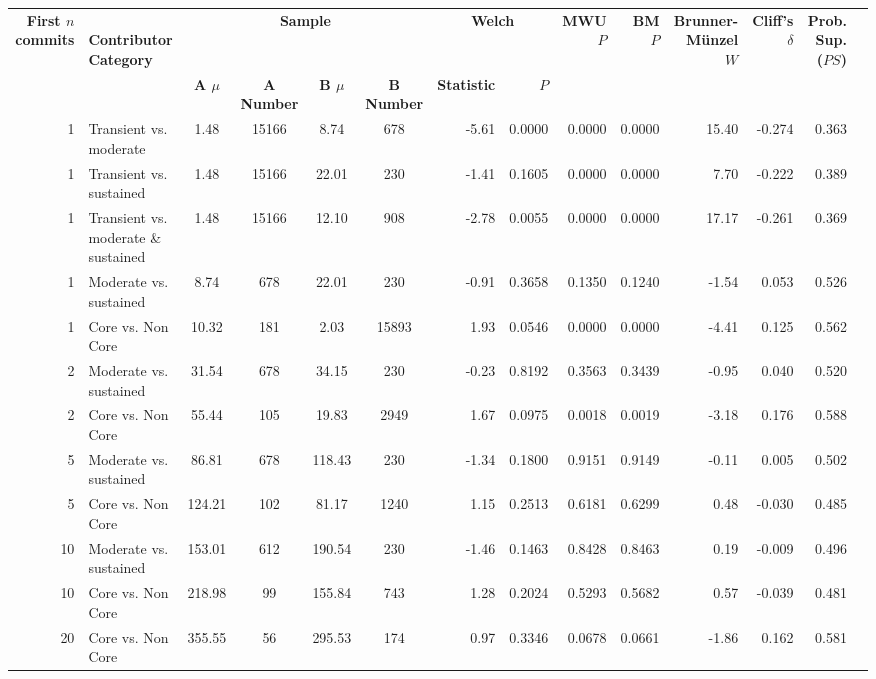 \begin{landscape}
\begin{table}[H]
\begin{tabular}{r p{4cm} c c c c r r r r r r r r}
\toprule
\makecell[t]{\textbf{First $n$}\\\textbf{commits}} & \makecell[t]{\textbf{}\\\textbf{Contributor}\\\textbf{Category}} & \multicolumn{4}{c}{\textbf{Sample}} & \multicolumn{2}{c}{\textbf{Welch}} & \textbf{MWU $P$} & \textbf{BM $P$} & \makecell[t]{\textbf{}\\\textbf{Brunner-Münzel}\\\textbf{$W$}} & \makecell[t]{\textbf{Cliff's}\\\textbf{$\delta$}} & \makecell[t]{\textbf{Prob. Sup.}\\\textbf{($PS$)}} \\ 
\cmidrule(lr){3-6} \cmidrule(lr){7-8}
 &  & \textbf{A $\mu$} & \textbf{A Number} & \textbf{B $\mu$} & \textbf{B Number} & \textbf{Statistic} & \textbf{$P$} &  &  &  &  &  \\ 
\midrule
1 & Transient vs. moderate &  1.48 & 15166 & 8.74 & 678 & -5.61 & 0.0000 & 0.0000 & 0.0000 & 15.40 & -0.274 & 0.363 \\ 
1 & Transient vs. sustained &  1.48 & 15166 & 22.01 & 230 & -1.41 & 0.1605 & 0.0000 & 0.0000 & 7.70 & -0.222 & 0.389 \\ 
1 & Transient vs. moderate \& sustained &  1.48 & 15166 & 12.10 & 908 & -2.78 & 0.0055 & 0.0000 & 0.0000 & 17.17 & -0.261 & 0.369 \\ 
1 & Moderate vs. sustained &  8.74 & 678 & 22.01 & 230 & -0.91 & 0.3658 & 0.1350 & 0.1240 & -1.54 & 0.053 & 0.526 \\ 
1 & Core vs. Non Core &  10.32 & 181 & 2.03 & 15893 & 1.93 & 0.0546 & 0.0000 & 0.0000 & -4.41 & 0.125 & 0.562 \\ 
2 & Moderate vs. sustained &  31.54 & 678 & 34.15 & 230 & -0.23 & 0.8192 & 0.3563 & 0.3439 & -0.95 & 0.040 & 0.520 \\ 
2 & Core vs. Non Core &  55.44 & 105 & 19.83 & 2949 & 1.67 & 0.0975 & 0.0018 & 0.0019 & -3.18 & 0.176 & 0.588 \\ 
5 & Moderate vs. sustained &  86.81 & 678 & 118.43 & 230 & -1.34 & 0.1800 & 0.9151 & 0.9149 & -0.11 & 0.005 & 0.502 \\ 
5 & Core vs. Non Core &  124.21 & 102 & 81.17 & 1240 & 1.15 & 0.2513 & 0.6181 & 0.6299 & 0.48 & -0.030 & 0.485 \\ 
10 & Moderate vs. sustained &  153.01 & 612 & 190.54 & 230 & -1.46 & 0.1463 & 0.8428 & 0.8463 & 0.19 & -0.009 & 0.496 \\ 
10 & Core vs. Non Core &  218.98 & 99 & 155.84 & 743 & 1.28 & 0.2024 & 0.5293 & 0.5682 & 0.57 & -0.039 & 0.481 \\ 
20 & Core vs. Non Core &  355.55 & 56 & 295.53 & 174 & 0.97 & 0.3346 & 0.0678 & 0.0661 & -1.86 & 0.162 & 0.581 \\ 
\bottomrule
\end{tabular}%
\label{tab:codebase_graph_latex_repository_graph_component_time_series_statistical_significance_test_methods} 
\end{table}
\end{landscape}
\newpage 

